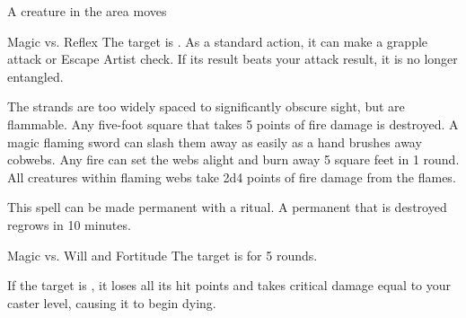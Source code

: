 \begin{spellheader}
    \spelldur{\durshort \dismissable}
\end{spellheader}
\begin{spelleffects}
    \begin{spelltrigger}{A creature in the area moves}
        \begin{spellattack}{Magic vs. Reflex}
            \spellsuccess The target is \entangled. As a standard action, it can make a grapple attack or Escape Artist check. If its result beats your attack result, it is no longer entangled.
        \end{spellattack}
    \end{spelltrigger}
\end{spelleffects}
\begin{spellfooter}
    \spellnotes The strands are too widely spaced to significantly obscure sight, but are flammable. Any five-foot square that takes 5 points of fire damage is destroyed. A magic flaming sword can slash them away as easily as a hand brushes away cobwebs. Any fire can set the webs alight and burn away 5 square feet in 1 round. All creatures within flaming webs take 2d4 points of fire damage from the flames.

    This spell can be made permanent with a  ritual. A permanent  that is destroyed regrows in 10 minutes.
\end{spellfooter}

\begin{spellheader}
\end{spellheader}
\begin{spelleffects}
    \begin{spellattack}{Magic vs. Will and Fortitude}
        \spellsuccess[Will] The target is \shaken for 5 rounds.

         If the target is \bloodied, it loses all its hit points and takes critical damage equal to your caster level, causing it to begin dying.
    \end{spellattack}
\end{spelleffects}
\begin{spellfooter}

\end{spellfooter}

